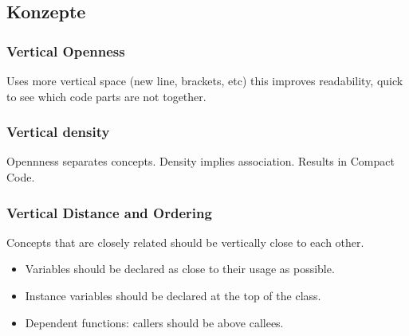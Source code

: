 \documentclass[10pt]{article}
\begin{document}
    \subsection{Konzepte}
    \subsubsection{Vertical Openness}
    Uses more vertical space (new line, brackets, etc) this improves readability, quick to see which code parts are not together.

    \subsubsection{Vertical density}
    Opennness separates concepts. Density implies association. Results in Compact Code.

    \subsubsection{Vertical Distance and Ordering}
    Concepts that are closely related should be vertically close to each other.
    \begin{itemize}
        \item Variables should be declared as close to their usage as possible.
        \item Instance variables should be declared at the top of the class.
        \item Dependent functions: callers should be above callees.
    \end{itemize}
\end{document}
